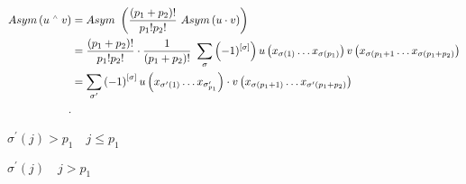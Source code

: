 \documentclass{book}
\newcommand{\p}[1]{#1^{\prime}}
\let\latexwedge\wedge
\def\wedge{\,\raisebox{0.5ex}{\ensuremath{\scriptscriptstyle\latexwedge}\,}}
\theoremstyle{definition}
\begin{document}
\begin{align*}    
    Asym\left( u\wedge v \right)  &= Asym~\left( \frac{\left( p_1+p_2 \right) !}{p_1!p_2!}~Asym\left( u\cdot v \right)  \right) \\
                                  &= \frac{\left( p_1+p_2 \right) !}{p_1!p_2!}\cdot \frac{1}{\left( p_1+p_2 \right) !}~ \sum_{\sigma}\left( -1)^{\left[ \sigma \right] } \right) u\left( x_{\sigma(1)} \ldots x_{\sigma(p_1)} \right) v\left( x_{\sigma(p_1+1} \ldots x_{\sigma\left( p_1+p_2 \right) } \right)  \\
                                  &= \sum_{\p \sigma} \left( -1 \right) ^{\left[ \sigma \right] } u\left( x_{\p \sigma(1)} \ldots x_{\p \sigma_{p_1}} \right) \cdot v\left( x_{\sigma\left( p_1+1 \right) }\ldots x_{\p\sigma\left( p_1+p_2 \right) } \right)  \\
.\end{align*}

$\p\sigma(j)>p_1\quad j\leqslant p_1$

$\p\sigma(j)\quad j>p_1$
\end{document}
